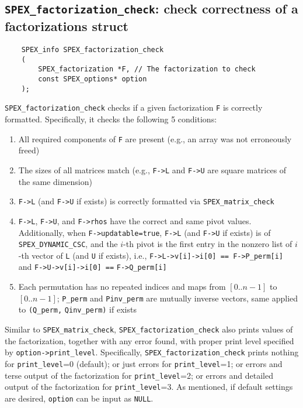 \documentclass[12pt]{report}
\theoremstyle{definition}
\begin{document}
\subsection{\texttt{SPEX\_factorization\_check}: check correctness of a factorizations struct}\label{ss:spex_factorization_check}

\begin{mdframed}[userdefinedwidth=6in]
{\footnotesize
\begin{verbatim}
    SPEX_info SPEX_factorization_check
    (
        SPEX_factorization *F, // The factorization to check
        const SPEX_options* option
    );
\end{verbatim}
} \end{mdframed}

\verb|SPEX_factorization_check| checks if a given factorization \verb|F| is correctly formatted. Specifically, it checks the following 5 conditions:
\begin{enumerate}
    \item All required components of \verb|F| are present (e.g., an array was not erroneously freed)
    \item The sizes of all matrices match (e.g., \verb|F->L| and \verb|F->U| are square matrices of the same dimension)
    \item \verb|F->L| (and \verb|F->U| if exists) is correctly formatted via \verb|SPEX_matrix_check|
    \item \verb|F->L|, \verb|F->U|, and \verb|F->rhos| have the correct and same pivot values. Additionally, when \verb|F->updatable=true|, \verb|F->L| (and \verb|F->U| if exists) is of \verb|SPEX_DYNAMIC_CSC|, and the $i$-th pivot is the first entry in the nonzero list of $i$-th vector of \verb|L| (and \verb|U| if exists), i.e., \verb|F->L->v[i]->i[0] == F->P_perm[i]| and \verb|F->U->v[i]->i[0] ==| \verb|F->Q_perm[i]|
    \item Each permutation has no repeated indices and maps from $[0..n-1]$ to $[0..n-1]$; \verb|P_perm| and \verb|Pinv_perm| are mutually inverse vectors, same applied to \verb|(Q_perm,| \verb|Qinv_perm)| if exists
\end{enumerate}

Similar to \verb|SPEX_matrix_check|, \verb|SPEX_factorization_check| also prints values of the factorization, together with any error found, with proper print level specified by
\verb|option->print_level|. Specifically, \verb|SPEX_factorization_check| prints nothing for \verb|print_level|=0 (default); or just errors for \verb|print_level|=1; or errors and terse output of the factorization for \verb|print_level|=2; or errors and detailed output of the factorization for \verb|print_level|=3.
As mentioned, if default settings are desired, \verb|option| can be input as \verb|NULL|. 
\end{document}
